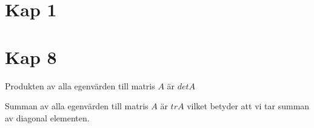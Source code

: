 \documentclass[twocolumn,a4paper]{article}
\begin{document}
\section*{Kap 1}

\section*{Kap 8}
Produkten av alla egenvärden till matris $A$ är $det A$

Summan av alla egenvärden till matris $A$ är $tr A$ vilket betyder att vi tar summan av diagonal elementen.
\end{document}
